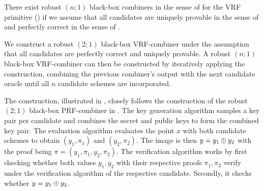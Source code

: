 \begin{lemma}\label{lemma:strong_robust_black_box_combiners}
	There exist robust $(n;1)$ black-box combiners in the sense of 
	for the VRF primitive () if we assume that all candidates are uniquely provable in the sense of 
	and perfectly correct in the sense of .
\end{lemma}


We construct a robust $(2;1)$ black-box VRF-combiner under the assumption that all 
candidates are perfectly correct and uniquely provable. A robust $(n;1)$ black-box VRF-combiner 
can then be constructed by iteratively applying the construction, combining the previous combiner's output 
with the next candidate oracle until all $n$ candidate schemes are incorporated.

The construction, illustrated in , closely follows the construction of the robust 
$(2;1)$ black-box PRF-combiner in .
The key generation algorithm samples a key pair per candidate and combines the secret and public keys to 
form the combined key pair. The evaluation algorithm evaluates the point $x$ with both candidate schemes
to obtain $(y_1, \pi_1)$ and $(y_2, \pi_2)$. The image is then $y = y_1 \oplus y_2$ with the proof being 
$\pi = (y_1, \pi_1, y_2, \pi_2)$.
The verification algorithm works by first checking whether both values $y_1, y_2$ with their respective proofs $\pi_1, \pi_2$ 
verify under the verification algorithm of the respective candidate. Secondly, it checks whether $y = y_1 \oplus y_2$.

